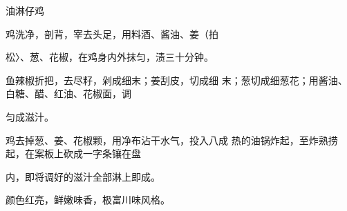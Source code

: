 \begin{recipe}{油淋仔鸡}

\ingredients


\cooking

\step 鸡洗净，剖背，宰去头足，用料酒、酱油、姜（拍

松〉、葱、花椒，在鸡身内外抹匀，渍三十分钟。

\step 鱼辣椒折把，去尽籽，剁成细末；姜刮皮，切成细 末；葱切成细葱花；用酱油、白糖、醋、红油、花椒面，调

匀成滋汁。

鸡去掉葱、姜、花椒颗，用净布沾干水气，投入八成 热的油锅炸起，至炸熟捞起，在案板上砍成一字条镶在盘

内，即将调好的滋汁全部淋上即成。

\notes

颜色红亮，鲜嫩味香，极富川味风格。

\end{recipe}

